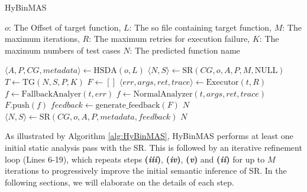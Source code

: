 \documentclass[acmsmall,screen,review,anonymous]{acmart} %
\begin{document}
\begin{algorithm}
  \caption{HyBinMAS}
  \label{alg:HyBinMAS}
  \begin{algorithmic}[1]
    \REQUIRE $o$: The Offset of target function, $L$: The so file containing target function, $M$: The maximum iterations, $R$: The maximum retries for execution failure, $K$: The maximum numbers of test cases
    \ENSURE $N$: The predicted function name

    \STATE $\langle A, P, CG, metadata \rangle \gets \text{HSDA}(o, L)$
    \STATE $\langle N, S \rangle \gets \text{SR}(CG, o, A, P, M, \text{NULL})$
        \STATE $T \gets \text{TG}(N, S, P, K)$
        \STATE $F \gets []$
            \STATE $\langle err, args, ret, trace \rangle \gets \text{Executor}(t, R)$
                \STATE $f \gets \text{FallbackAnalyer}(t, err)$
            \ELSE
                \STATE $f \gets \text{NormalAnalyzer}(t, args, ret, trace)$
            \ENDIF
            \STATE $F.\text{push}(f)$
        \ENDFOR
        \STATE $feedback \gets \text{generate\_feedback}(F)$
            \RETURN $N$
        \ENDIF
        \STATE $\langle N, S \rangle \gets \text{SR}(CG, o, A, P, metadata, feedback)$
    \ENDFOR
    \RETURN $N$
  \end{algorithmic}
\end{algorithm}

As illustrated by Algorithm \ref{alg:HyBinMAS}, HyBinMAS performs at least one initial static analysis pass with the SR. This is followed by an iterative refinement loop (Lines 6-19), which repeats steps \textbf{(\textit{iii})}, \textbf{(\textit{iv})}, \textbf{(\textit{v})} and \textbf{(\textit{ii})} for up to $M$ iterations to progressively improve the initial semantic inference of SR. In the following sections, we will elaborate on the details of each step.

\end{document}
